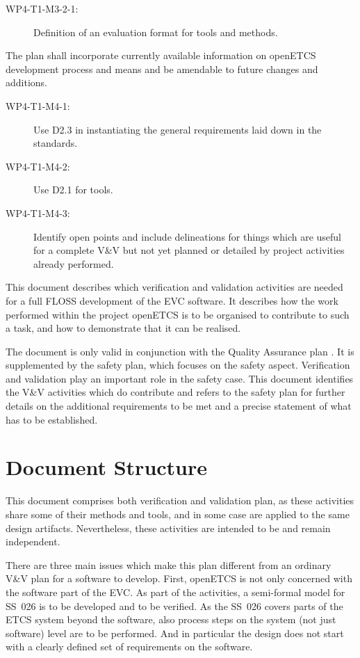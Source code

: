 \documentclass{template/openetcs_report}
\begin{document}
{\begin{description}
\begin{description}
  \item[WP4-T1-M3-2-1:] Definition of an evaluation format for tools
    and methods.
  \end{description}
\item[WP4-T1-G4:] The plan shall incorporate currently available
  information on openETCS development process and means and be
  amendable to future changes and additions.
  \begin{description}
  \item[WP4-T1-M4-1:] Use D2.3 in instantiating the general
    requirements laid down in the standards.
  \item[WP4-T1-M4-2:] Use D2.1 for tools.
  \item[WP4-T1-M4-3:] Identify open points and include delineations
    for things which are useful for a complete V\&V but not yet
    planned or detailed by project activities already performed.
  \end{description}
\end{description}
}

This document describes which verification and validation activities
are needed for a full FLOSS development of the EVC software. It
describes how the work performed within the project openETCS is to be
organised to contribute to such a task, and how to demonstrate that it
can be realised.

The document is only valid in conjunction with the Quality Assurance
plan \cite{QAplan}. It is supplemented by the safety plan, which
focuses on the safety aspect. Verification and validation play an
important role in the safety case. This document identifies the V\&V
activities which do contribute and refers to the safety plan for
further details on the additional requirements to be met and a precise
statement of what has to be established.

\section{Document Structure}
\label{sec:document-structure}

This document comprises both verification and validation plan, as
these activities share some of their methods and tools, and in some
case are applied to the same design artifacts. Nevertheless, these
activities are intended to be and remain independent.

There are three main issues which make this plan different from an
ordinary V\&V plan for a software to develop. First, openETCS is not
only concerned with the software part of the EVC. As part of the
activities, a semi-formal model for SS~026 is to be developed and to
be verified. As the SS~026 covers parts of the ETCS system beyond the
software, also process steps on the system (not just software) level
are to be performed. And in particular the design does not start with
a clearly defined set of requirements on the software.
\end{document}
